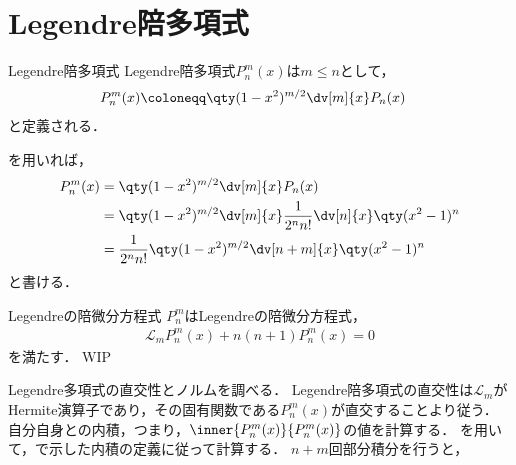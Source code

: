 \documentclass{report}
\begin{document}
    \section{Legendre陪多項式}
      \begin{mydef}{Legendre陪多項式}{}
        Legendre陪多項式$P_n^m(x)$は$m \leq n$として，
        \begin{align}
          P_n^m(x) &\coloneqq \qty(1 - x^2)^{m/2}\dv[m]{x}P_n(x)
        \end{align}
        と定義される．
      \end{mydef}
      \begin{myrem}{}{}
        を用いれば，
        \begin{align}
          P_n^m(x) &= \qty(1 - x^2)^{m/2}\dv[m]{x}P_n(x) \\ 
          &= \qty(1 - x^2)^{m/2}\dv[m]{x}\frac{1}{2^nn!}\dv[n]{x}\qty(x^2 - 1)^n \\ 
          &= \frac{1}{2^nn!}\qty(1 - x^2)^{m/2}\dv[n + m]{x}\qty(x^2 - 1)^n \label{assos-legendre-polynominal}
      \end{align}
      と書ける．
      \end{myrem}
      \begin{myprop}{Legendreの陪微分方程式}{}
        $P_n^m$はLegendreの陪微分方程式，
        \begin{align}
          \mathcal{L}_mP_n^m(x) + n(n + 1)P_n^m(x) = 0\label{assos-legendre-diff-eq}
        \end{align}
        を満たす．
        \tcblower
        WIP
      \end{myprop}
      Legendre多項式の直交性とノルムを調べる．
      Legendre陪多項式の直交性は$\mathcal{L}_m$がHermite演算子であり，その固有関数である$P_n^m(x)$が直交することより従う．
      自分自身との内積，つまり，$\inner{P_n^m(x)}{P_n^m(x)}$の値を計算する．
      を用いて，で示した内積の定義に従って計算する．
      $n + m$回部分積分を行うと，
\end{document}

